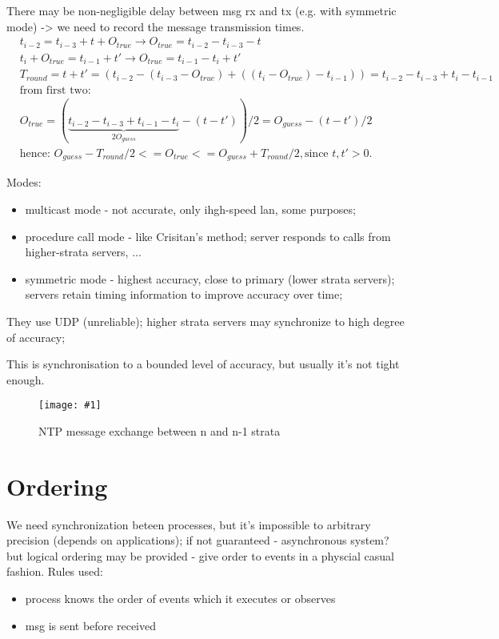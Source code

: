 \documentclass[10pt,a4paper]{article}
\newcommand{\insImg}[2] { %
	\begin{figure}[ht!] %
		\centering %
		\texttt{[image: \#1]} %
		\caption{#2} %
		\label{overflow} %
	\end{figure} %
}
\begin{document}
There may be non-negligible delay between msg rx and tx (e.g. with symmetric mode) -> we need to record the message transmission times. 
\begin{align}
&t_{i-2} = t_{i-3} + t + O_{true} \rightarrow O_{true} = t_{i-2} - t_{i-3} - t\\
&t_{i} + O_{true} = t_{i-1} + t' \rightarrow O_{true} = t_{i-1} - t_{i} + t'\\
&T_{round} = t + t' = (t_{i-2} - (t_{i-3} - O_{true}) + ( (t_{i} - O_{true}) - t_{i-1})) = t_{i-2} - t_{i-3} + t_{i} - t_{i-1}\\
&\text{from first two:}\\
&O_{true} = (\underbrace{t_{i-2} - t_{i-3} + t_{i-1} - t_{i}}_{2O_{guess}} - (t - t'))/2 = O_{guess} - (t-t')/2 \\
&\text{hence: } O_{guess} - T_{round}/2 <= O_{true} <= O_{guess} + T_{round}/2, \text{since } t,t' > 0.
\end{align}

Modes: 
\begin{itemize}
	\item multicast mode - not accurate, only ihgh-speed lan, some purposes;
	\item procedure call mode - like Crisitan's method; server responds to calls from higher-strata servers, ...
	\item symmetric mode - highest accuracy, close to primary (lower strata servers);  servers retain timing information to improve accuracy over time;
\end{itemize}
They use UDP (unreliable); higher strata servers may synchronize to high degree of accuracy; 

This is synchronisation to a bounded level of accuracy, but usually it's not tight enough.

\insImg{ntp}{NTP message exchange between n and n-1 strata}

\section {Ordering}
We need synchronization beteen processes, but it's impossible to arbitrary precision (depends on applications); if not guaranteed - asynchronous system? but logical ordering may be provided - give order to events in a physcial casual fashion. Rules used:
\begin{itemize}
	\item process knows the order of events which it executes or observes
	\item msg is sent before received
\end{itemize}
\end{document}
